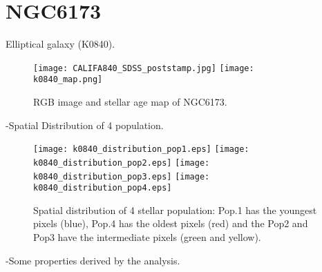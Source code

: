 \newpage
\section*{NGC6173}
Elliptical galaxy (K0840).

\begin{figure}[bh]
\begin{center}
\texttt{[image: CALIFA840\_SDSS\_poststamp.jpg]}
\texttt{[image: k0840\_map.png]}
\caption{RGB image and stellar age map of NGC6173.}
   \label{fig1}
\end{center}
\end{figure}

-Spatial Distribution of 4 population.



\begin{figure}[bh]
\begin{center}
\texttt{[image: k0840\_distribution\_pop1.eps]}
\texttt{[image: k0840\_distribution\_pop2.eps]}
\texttt{[image: k0840\_distribution\_pop3.eps]}
\texttt{[image: k0840\_distribution\_pop4.eps]}
 \caption{Spatial distribution of 4 stellar population: Pop.1 has the youngest pixels (blue), Pop.4 has the oldest pixels (red) and the Pop2 and Pop3 have the intermediate pixels (green and yellow).}
   \label{fig1}
\end{center}
\end{figure}


-Some properties derived by the analysis.


